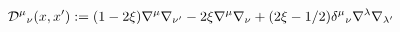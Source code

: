 \begin{equation}
{\cal D}^\mu{}_\nu(x,x'):=
(1-2\xi)\nabla^\mu\nabla_{\nu'} - 2\xi\nabla^\mu\nabla_{\nu} 
+ (2\xi - 1/2)\delta^\mu{}_\nu
\nabla^\lambda\nabla_{\lambda'} 
\label{doperator}
\end{equation}

